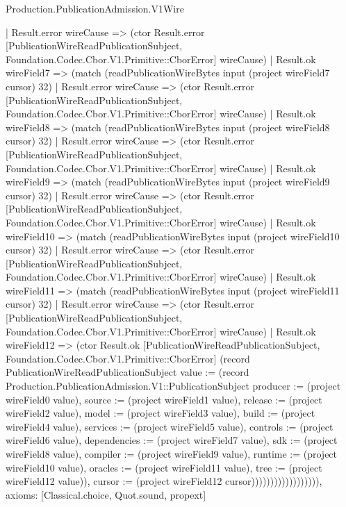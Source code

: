 \begin{lexlean}{Production.PublicationAdmission.V1Wire}
\begin{semanticmodule}
{                      | Result.error wireCause => (ctor Result.error [PublicationWireReadPublicationSubject, Foundation.Codec.Cbor.V1.Primitive::CborError] wireCause)
                      | Result.ok wireField7 => (match (readPublicationWireBytes input (project wireField7 cursor) 32)
                        | Result.error wireCause => (ctor Result.error [PublicationWireReadPublicationSubject, Foundation.Codec.Cbor.V1.Primitive::CborError] wireCause)
                        | Result.ok wireField8 => (match (readPublicationWireBytes input (project wireField8 cursor) 32)
                          | Result.error wireCause => (ctor Result.error [PublicationWireReadPublicationSubject, Foundation.Codec.Cbor.V1.Primitive::CborError] wireCause)
                          | Result.ok wireField9 => (match (readPublicationWireBytes input (project wireField9 cursor) 32)
                            | Result.error wireCause => (ctor Result.error [PublicationWireReadPublicationSubject, Foundation.Codec.Cbor.V1.Primitive::CborError] wireCause)
                            | Result.ok wireField10 => (match (readPublicationWireBytes input (project wireField10 cursor) 32)
                              | Result.error wireCause => (ctor Result.error [PublicationWireReadPublicationSubject, Foundation.Codec.Cbor.V1.Primitive::CborError] wireCause)
                              | Result.ok wireField11 => (match (readPublicationWireBytes input (project wireField11 cursor) 32)
                                | Result.error wireCause => (ctor Result.error [PublicationWireReadPublicationSubject, Foundation.Codec.Cbor.V1.Primitive::CborError] wireCause)
                                | Result.ok wireField12 => (ctor Result.ok [PublicationWireReadPublicationSubject, Foundation.Codec.Cbor.V1.Primitive::CborError] (record PublicationWireReadPublicationSubject {value := (record Production.PublicationAdmission.V1::PublicationSubject {producer := (project wireField0 value), source := (project wireField1 value), release := (project wireField2 value), model := (project wireField3 value), build := (project wireField4 value), services := (project wireField5 value), controls := (project wireField6 value), dependencies := (project wireField7 value), sdk := (project wireField8 value), compiler := (project wireField9 value), runtime := (project wireField10 value), oracles := (project wireField11 value), tree := (project wireField12 value)}), cursor := (project wireField12 cursor)}))))))))))))))))),
  axioms: [Classical.choice, Quot.sound, propext]
}


\end{semanticmodule}
\end{lexlean}
